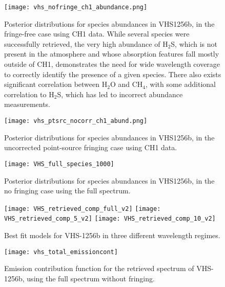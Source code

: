 \begin{figure}[t]
	\centering
	\texttt{[image: vhs\_nofringe\_ch1\_abundance.png]}
	\caption{Posterior distributions for species abundances in VHS1256b, in the fringe-free case using CH1 data. While several species were successfully retrieved, the very high abundance of H$_{2}$S, which is not present in the atmosphere and whose absorption features fall mostly outside of CH1, demonstrates the need for wide wavelength coverage to correctly identify the presence of a given species. There also exists significant correlation between H$_{2}$O and CH$_{4}$, with some additional correlation to H$_{2}$S, which has led to incorrect abundance measurements.}
	\label{fig:postVHS_abundances}
\end{figure}
\begin{figure}
	\centering
	\texttt{[image: vhs\_ptsrc\_nocorr\_ch1\_abund.png]}
	\caption{Posterior distributions for species abundances in VHS1256b, in the uncorrected point-source fringing case using CH1 data.}
	\label{fig:postVHS_abundances_fringe}
\end{figure}
\begin{figure}
	\centering
	\texttt{[image: VHS\_full\_species\_1000]}
	\caption{Posterior distributions for species abundances in VHS1256b, in the no fringing case using the full spectrum. }
	\label{fig:postVHS_abundances_full}
\end{figure}

\begin{figure}[h]
	\centering
	\texttt{[image: VHS\_retrieved\_comp\_full\_v2]}
	\texttt{[image: VHS\_retrieved\_comp\_5\_v2]}
	\texttt{[image: VHS\_retrieved\_comp\_10\_v2]}
	\caption{Best fit models for VHS-1256b in three different wavelength regimes.}
	\label{fig:bestfitVHS}
\end{figure}
\begin{figure}[h]
	\texttt{[image: vhs\_total\_emissioncont]}
	\caption{Emission contribution function for the retrieved spectrum of VHS-1256b, using the full spectrum without fringing.}
	\label{fig:VHSemcont}
\end{figure}
\clearpage
